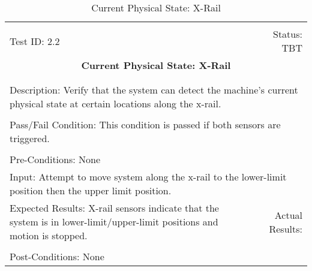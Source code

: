 \documentclass[titlepage]{article}
\begin{document}
\begin{center}%
\begin{table}[h!]
\begin{tabular}{|l r|}\hline&\\[-2mm]
	Test ID: 2.2	&Status: TBT\\[-3mm]
	\multicolumn{2}{|c|}{\textbf{\large{Current Physical State: X-Rail}}}\\&\\\hline&\\[-3mm]
	\multicolumn{2}{|p{\textwidth}|}{Description: Verify that the system can detect the machine's current physical state at certain locations along the x-rail.}\\[1mm]\hline&\\[-3mm]
	\multicolumn{2}{|p{\textwidth}|}{Pass/Fail Condition: This condition is passed if both sensors are triggered.}\\[1mm]\hline&\\[-3mm]
	\multicolumn{2}{|p{\textwidth}|}{Pre-Conditions: None}\\[4mm]
	\multicolumn{2}{|p{\textwidth}|}{Input: Attempt to move system along the x-rail to the lower-limit position then the upper limit position.}\\[2mm]\hline
	\multicolumn{1}{|p{0.49\textwidth}}{Expected Results: X-rail sensors indicate that the system is in lower-limit/upper-limit positions and motion is stopped.}	&\multicolumn{1}{|p{0.45\textwidth}|}{Actual Results:}\\\hline&\\[-3mm]
	\multicolumn{2}{|p{\textwidth}|}{Post-Conditions: None}\\\hline
\end{tabular}
\caption{Current Physical State: X-Rail}
\end{table}
\end{center}
\end{document}
